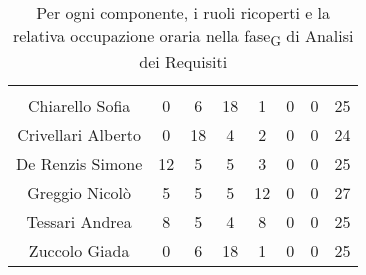 \begin{table}[H]
	\begin{center}
		\begin{tabular}{c
				!{\color[HTML]{9b240a}\vrule width 1pt}
				cccccc
				!{\color[HTML]{9b240a}\vrule width 1pt}	
				c}
			\rowcolorhead
			 &  &  &  &  &  &  &  \\
			
			Chiarello Sofia & 0 & 6 & 18 & 1 & 0 & 0 & 25\\
			Crivellari Alberto & 0 & 18 & 4 & 2 & 0 & 0 & 24\\
			De Renzis Simone & 12 & 5 & 5 & 3 & 0 & 0 & 25\\
			Greggio Nicolò & 5 & 5 & 5 & 12 & 0 & 0 & 27\\
			Tessari Andrea & 8 & 5 & 4 & 8 & 0 & 0 & 25\\
			Zuccolo Giada & 0 & 6 & 18 & 1 & 0 & 0 & 25\\
		\end{tabular}
		\caption[Occupazione oraria Analisi dei Requisiti]{Per ogni componente, i ruoli ricoperti e la relativa occupazione oraria nella \gls{fase}\textsubscript{G} di Analisi dei Requisiti}
	\end{center}
\end{table}


